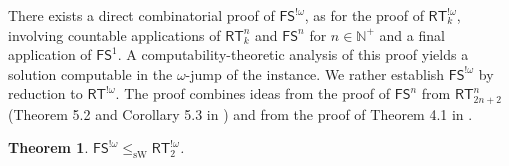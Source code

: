 \documentclass[10pt,a4paper]{article}
\newcommand{\FS}[0]{\mathsf{FS}}
\newcommand{\RT}[0]{\mathsf{RT}}
\newcommand{\NN}[0]{\mathbb{N}}
\newcommand{\sW}{\mathrm{sW}}
\newtheorem{theorem}{Theorem}
\numberwithin{theorem}{section}
\begin{document}
There exists a direct combinatorial proof of $\FS^{!\omega}$, as for the proof of $\RT^{!\omega}_k$, involving countable applications of $\RT^n_k$ and $\FS^n$ for $n \in \NN^+$ and a final application of $\FS^1$. 
A computability-theoretic analysis of this proof yields a solution computable in the $\omega$-jump of the instance.
We rather establish $\FS^{!\omega}$ by reduction to $\RT^{!\omega}$. The proof combines ideas from the proof of $\FS^n$ from $\RT^n_{2n+2}$ (Theorem 5.2 and Corollary 5.3 in \cite{Cholak_Giusto_Hirst_Jockusch_2005}) and from the proof of Theorem 4.1 in \cite{carlucci2014strength}.

\begin{theorem}\label{thm:fs_red_rt}
    $\FS^{!\omega} \leq_{\sW} \RT^{!\omega}_2$.
\end{theorem}
\end{document}
